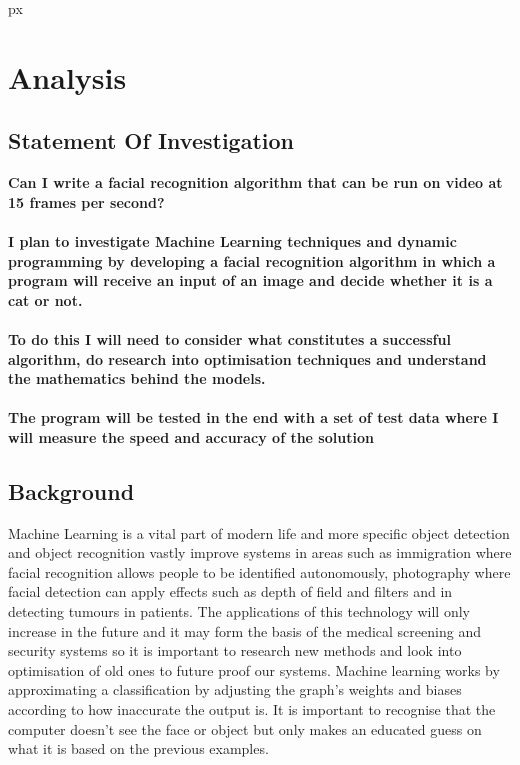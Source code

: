  px
\section{\textbf{Analysis}}



\subsection{Statement Of Investigation}
\vspace{15px}
\begin{center}
    \textbf{Can I write a facial recognition algorithm that can be run on video at 15 frames per second?}
\end{center}
\vspace{2px}
\paragraph{I plan to investigate Machine Learning techniques and dynamic programming by developing a facial recognition algorithm in which a program will receive an input of an image and decide whether it is a cat or not.}
\par
\paragraph{To do this I will need to consider what constitutes a successful algorithm, do research into optimisation techniques and understand the mathematics behind the models.}
\par
\paragraph{The program will be tested in the end with a set of test data where I will measure the speed and accuracy of the solution}

\newpage




\subsection{Background}
\par
Machine Learning is a vital part of modern life and more specific object detection and object recognition vastly improve systems in areas such as immigration where facial recognition allows people to be identified autonomously, photography where facial detection can apply effects such as depth of field and filters and in detecting tumours in patients. The applications of this technology will only increase in the future and it may form the basis of the medical screening and security systems so it is important to research new methods and look into optimisation of old ones to future proof our systems. Machine learning works by approximating a classification by adjusting the graph's weights and biases according to how inaccurate the output is. It is important to recognise that the computer doesn't see the face or object but only makes an educated guess on what it is based on the previous examples.
\par

